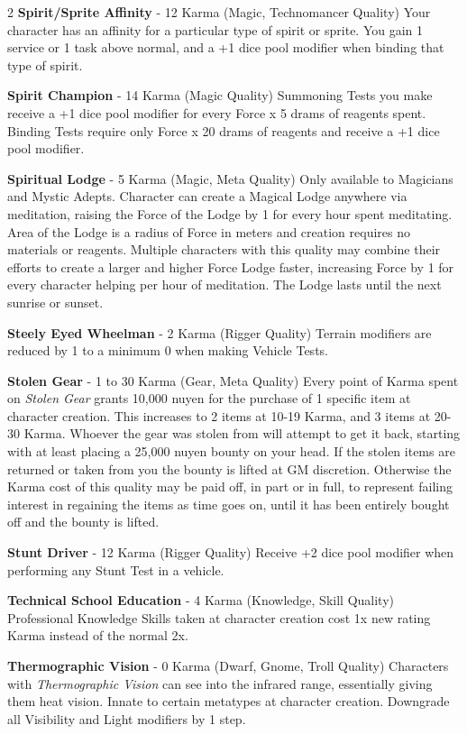 \documentclass[
  oneside]{article}
\begin{document}
\begin{multicols}{2}
\textbf{Spirit/Sprite Affinity} - 12 Karma (Magic,
Technomancer Quality) Your character has an
affinity for a particular type of spirit or
sprite. You gain 1 service or 1 task above normal,
and a +1 dice pool modifier when binding that type
of spirit.

\textbf{Spirit Champion} - 14 Karma (Magic
Quality) Summoning Tests you make receive a +1
dice pool modifier for every Force x 5 drams of
reagents spent. Binding Tests require only Force x
20 drams of reagents and receive a +1 dice pool
modifier.

\textbf{Spiritual Lodge} - 5 Karma (Magic, Meta
Quality) Only available to Magicians and Mystic
Adepts. Character can create a Magical Lodge
anywhere via meditation, raising the Force of the
Lodge by 1 for every hour spent meditating. Area
of the Lodge is a radius of Force in meters and
creation requires no materials or reagents.
Multiple characters with this quality may combine
their efforts to create a larger and higher Force
Lodge faster, increasing Force by 1 for every
character helping per hour of meditation. The
Lodge lasts until the next sunrise or sunset.

\textbf{Steely Eyed Wheelman} - 2 Karma (Rigger
Quality) Terrain modifiers are reduced by 1 to a
minimum 0 when making Vehicle Tests.

\textbf{Stolen Gear} - 1 to 30 Karma (Gear, Meta
Quality) Every point of Karma spent on
\emph{Stolen Gear} grants 10,000 nuyen for the
purchase of 1 specific item at character creation.
This increases to 2 items at 10-19 Karma, and 3
items at 20-30 Karma. Whoever the gear was stolen
from will attempt to get it back, starting with at
least placing a 25,000 nuyen bounty on your head.
If the stolen items are returned or taken from you
the bounty is lifted at GM discretion. Otherwise
the Karma cost of this quality may be paid off, in
part or in full, to represent failing interest in
regaining the items as time goes on, until it has
been entirely bought off and the bounty is lifted.

\textbf{Stunt Driver} - 12 Karma (Rigger Quality)
Receive +2 dice pool modifier when performing any
Stunt Test in a vehicle.

\textbf{Technical School Education} - 4 Karma
(Knowledge, Skill Quality) Professional Knowledge
Skills taken at character creation cost 1x new
rating Karma instead of the normal 2x.

\textbf{Thermographic Vision} - 0 Karma (Dwarf,
Gnome, Troll Quality) Characters with
\emph{Thermographic Vision} can see into the
infrared range, essentially giving them heat
vision. Innate to certain metatypes at character
creation. Downgrade all Visibility and Light
modifiers by 1 step.


\end{multicols}
\end{document}
